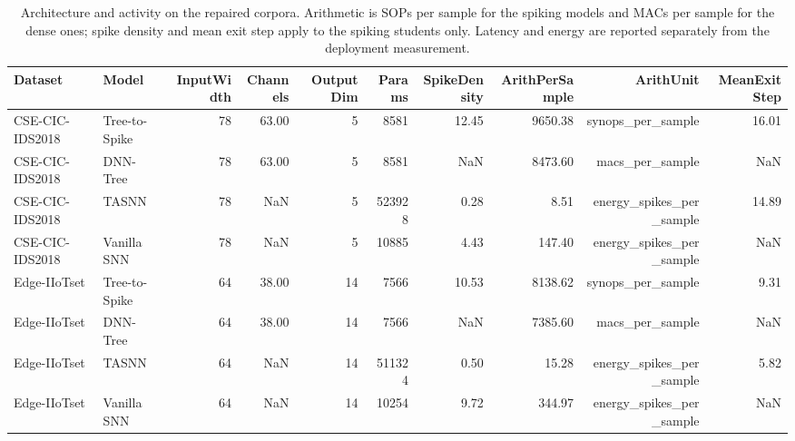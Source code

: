 \begin{table}[t]\centering\small
\caption{Architecture and activity on the repaired corpora. Arithmetic is SOPs per sample for the spiking models and MACs per sample for the dense ones; spike density and mean exit step apply to the spiking students only. Latency and energy are reported separately from the deployment measurement.}
\label{tab:repaired:anatomy}
\begin{tabular}{llrrrrrrrr}
\toprule
Dataset & Model & InputWidth & Channels & OutputDim & Params & SpikeDensity & ArithPerSample & ArithUnit & MeanExitStep \\
\midrule
CSE-CIC-IDS2018 & Tree-to-Spike & 78 & 63.00 & 5 & 8581 & 12.45 & 9650.38 & synops_per_sample & 16.01 \\
CSE-CIC-IDS2018 & DNN-Tree & 78 & 63.00 & 5 & 8581 & NaN & 8473.60 & macs_per_sample & NaN \\
CSE-CIC-IDS2018 & TASNN & 78 & NaN & 5 & 523928 & 0.28 & 8.51 & energy_spikes_per_sample & 14.89 \\
CSE-CIC-IDS2018 & Vanilla SNN & 78 & NaN & 5 & 10885 & 4.43 & 147.40 & energy_spikes_per_sample & NaN \\
Edge-IIoTset & Tree-to-Spike & 64 & 38.00 & 14 & 7566 & 10.53 & 8138.62 & synops_per_sample & 9.31 \\
Edge-IIoTset & DNN-Tree & 64 & 38.00 & 14 & 7566 & NaN & 7385.60 & macs_per_sample & NaN \\
Edge-IIoTset & TASNN & 64 & NaN & 14 & 511324 & 0.50 & 15.28 & energy_spikes_per_sample & 5.82 \\
Edge-IIoTset & Vanilla SNN & 64 & NaN & 14 & 10254 & 9.72 & 344.97 & energy_spikes_per_sample & NaN \\
\bottomrule
\end{tabular}
\end{table}

